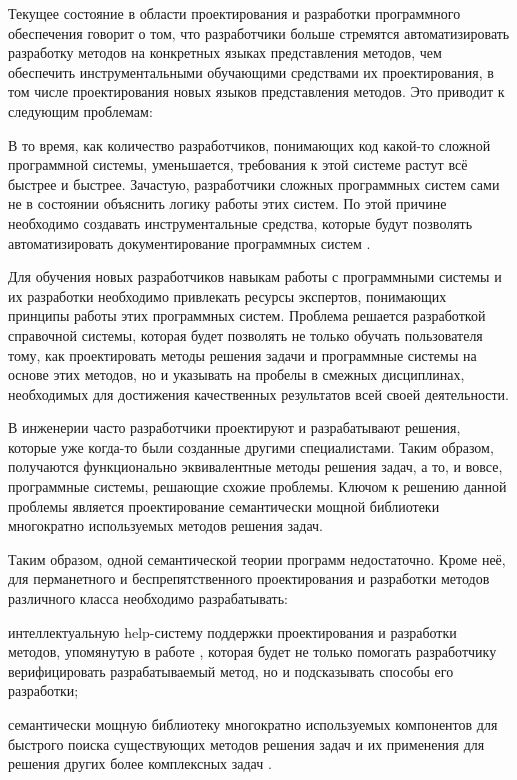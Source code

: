 Текущее состояние в области проектирования и разработки программного обеспечения говорит о том, что разработчики больше стремятся автоматизировать разработку методов на конкретных языках представления методов, чем обеспечить инструментальными обучающими средствами их проектирования, в том числе проектирования новых языков представления методов. Это приводит к следующим проблемам:
\begin{textitemize}
	\item В то время, как количество разработчиков, понимающих код какой-то сложной программной системы, уменьшается, требования к этой системе растут всё быстрее и быстрее. Зачастую, разработчики сложных программных систем сами не в состоянии объяснить логику работы этих систем. По этой причине необходимо создавать инструментальные средства, которые будут позволять автоматизировать документирование программных систем \cite{lu2022rethinking}.
	\item Для обучения новых разработчиков навыкам работы с программными системы и их разработки необходимо привлекать ресурсы экспертов, понимающих принципы работы этих программных систем. Проблема решается разработкой справочной системы, которая будет позволять не только обучать пользователя тому, как проектировать методы решения задачи и программные системы на основе этих методов, но и указывать на пробелы в смежных дисциплинах, необходимых для достижения качественных результатов всей своей деятельности.
	\item В инженерии часто разработчики проектируют и разрабатывают решения, которые уже когда-то были созданные другими специалистами. Таким образом, получаются функционально эквивалентные методы решения задач, а то, и вовсе, программные системы, решающие схожие проблемы. Ключом к решению данной проблемы является проектирование семантически мощной библиотеки многократно используемых методов решения задач.
\end{textitemize}

Таким образом, одной семантической теории программ недостаточно. Кроме неё, для перманетного и беспрепятственного проектирования и разработки методов различного класса необходимо разрабатывать:
\begin{textitemize}
	\item интеллектуальную help-систему поддержки проектирования и разработки методов, упомянутую в работе \cite{Gulakina2012}, которая будет не только помогать разработчику верифицировать разрабатываемый метод, но и подсказывать способы его разработки;
	\item семантически мощную библиотеку многократно используемых компонентов \cite{Ford2019} для быстрого поиска существующих методов решения задач и их применения для решения других более комплексных задач \cite{sales2022explainable}.
\end{textitemize}

